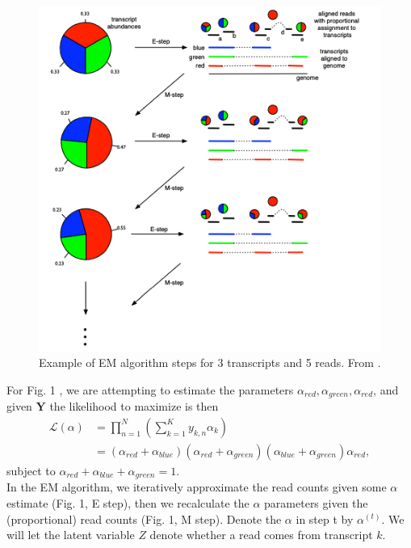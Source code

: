 \documentclass[11pt]{exam}
\begin{document}
\begin{questions}
\begin{figure}[!hb]
        \centering
        \includegraphics[scale=0.55]{Figures/emFig.png}
        \caption{Example of EM algorithm steps for 3 transcripts and 5 reads. From \cite{Pachter2011-tv}.}
    \end{figure}
    
For Fig. 1 , we are attempting to estimate the parameters $\alpha_{red}, \alpha_{green}, \alpha_{red}$, and given $\mathbf{Y}$ the likelihood to maximize is then \\
\begin{align*}
 \mathcal{L}(\alpha) &= \prod_{n=1}^{N} (\sum_{k=1}^{K} y_{k,n}\alpha_k) \\
  &=  (\alpha_{red} + \alpha_{blue})(\alpha_{red} + \alpha_{green})(\alpha_{blue} + \alpha_{green})\alpha_{red},
\end{align*}
subject to $ \alpha_{red} + \alpha_{blue} + \alpha_{green} = 1. $ \\

In the EM algorithm, we iteratively approximate the read counts given some $\alpha$ estimate (Fig. 1, E step), then we recalculate the $\alpha$ parameters given the (proportional) read counts (Fig. 1, M step). Denote the $\alpha$ in step t by $\alpha^{(t)}$. We will let the latent variable $Z$ denote whether a read comes from transcript $k$. \\


\end{questions}
\end{document}
